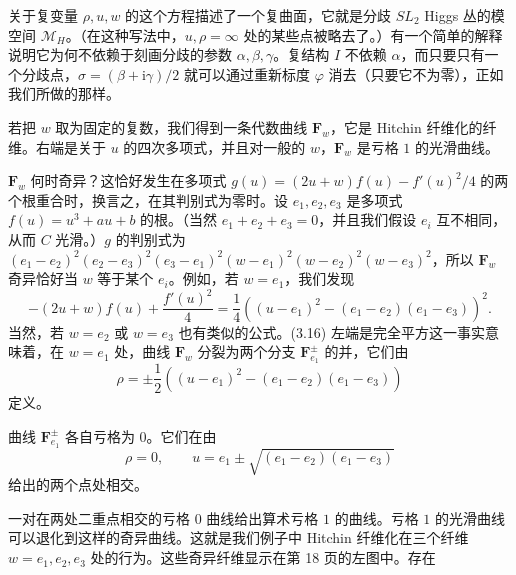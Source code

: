 \documentclass[11pt,a4paper]{article}
\newcommand{\ii}{\mathrm{i}}
\begin{document}
关于复变量 $\rho,u,w$ 的这个方程描述了一个复曲面，它就是分歧 $SL_2$ Higgs 丛的模空间 $\mathcal{M}_H$。（在这种写法中，$u,\rho=\infty$ 处的某些点被略去了。）有一个简单的解释说明它为何不依赖于刻画分歧的参数 $\alpha,\beta,\gamma$。复结构 $I$ 不依赖 $\alpha$，而只要只有一个分歧点，$\sigma=(\beta+\ii\gamma)/2$ 就可以通过重新标度 $\varphi$ 消去（只要它不为零），正如我们所做的那样。

若把 $w$ 取为固定的复数，我们得到一条代数曲线 $\boldsymbol{F}_w$，它是 Hitchin 纤维化的纤维。右端是关于 $u$ 的四次多项式，并且对一般的 $w$，$\boldsymbol{F}_w$ 是亏格 $1$ 的光滑曲线。

$\boldsymbol{F}_w$ 何时奇异？这恰好发生在多项式 $g(u)=(2u+w)f(u)-f'(u)^2/4$ 的两个根重合时，换言之，在其判别式为零时。设 $e_1,e_2,e_3$ 是多项式 $f(u)=u^3+au+b$ 的根。（当然 $e_1+e_2+e_3=0$，并且我们假设 $e_i$ 互不相同，从而 $C$ 光滑。）$g$ 的判别式为 $(e_1-e_2)^2(e_2-e_3)^2(e_3-e_1)^2(w-e_1)^2(w-e_2)^2(w-e_3)^2$，所以 $\boldsymbol{F}_w$ 奇异恰好当 $w$ 等于某个 $e_i$。例如，若 $w=e_1$，我们发现
\begin{equation}\tag{3.16}
-(2u+w)f(u)+\frac{f'(u)^2}{4}=\frac{1}{4}\left((u-e_1)^2-(e_1-e_2)(e_1-e_3)\right)^2.
\end{equation}
当然，若 $w=e_2$ 或 $w=e_3$ 也有类似的公式。(3.16) 左端是完全平方这一事实意味着，在 $w=e_1$ 处，曲线 $\boldsymbol{F}_w$ 分裂为两个分支 $\boldsymbol{F}_{e_1}^{\pm}$ 的并，它们由
\begin{equation}\tag{3.17}
\rho=\pm\frac{1}{2}\left((u-e_1)^2-(e_1-e_2)(e_1-e_3)\right)
\end{equation}
定义。

曲线 $\boldsymbol{F}_{e_1}^{\pm}$ 各自亏格为 $0$。它们在由
\begin{equation}\tag{3.18}
\rho=0,\qquad u=e_1\pm\sqrt{(e_1-e_2)(e_1-e_3)}
\end{equation}
给出的两个点处相交。

一对在两处二重点相交的亏格 $0$ 曲线给出算术亏格 $1$ 的曲线。亏格 $1$ 的光滑曲线可以退化到这样的奇异曲线。这就是我们例子中 Hitchin 纤维化在三个纤维 $w=e_1,e_2,e_3$ 处的行为。这些奇异纤维显示在第 18 页的左图中。存在
\end{document}
